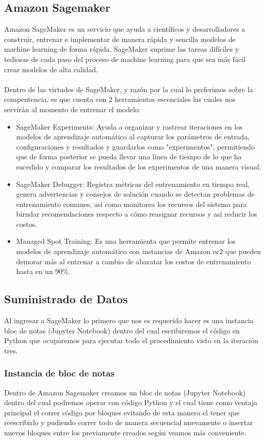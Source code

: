 \documentclass[12pt, a4paper, titlepage]{report}
\begin{document}
	\subsection{Amazon Sagemaker}
	Amazon SageMaker es un servicio que ayuda a científicos y desarrolladores a construir, entrenar e implementar de manera rápida y sencilla modelos de machine learning de forma rápida. SageMaker suprime las tareas difíciles y tediosas de cada paso del proceso de machine learning para que sea más fácil crear modelos de alta calidad.\\\\
	Dentro de las virtudes de SageMaker, y razón por la cual lo preferimos sobre la compentencia, es que cuenta con 2 herramientas escenciales las cuales nos servirán al momento de entrenar el modelo:
	\begin{itemize}
	\item SageMaker Experiments: Ayuda a organizar y rastrear iteraciones en los modelos de aprendizaje automático al capturar los parámetros de entrada, configuraciones y resultados y guardarlos como "experimentos", permitiendo que de forma posterior se pueda llevar una línea de tiempo de lo que ha sucedido y comparar los resultados de los experimentos de una manera visual.
	\item SageMaker Debugger: Registra métricas del entrenamiento en tiempo real, genera advertencias y consejos de solución cuando se detectan problemas de entrenamiento comunes, así como monitorea los recursos del sistema para birndar recomendaciones respecto a cómo reasignar recursos y así reducir los costos.
	\item Managed Spot Training: Es una herramienta que permite entrenar los modelos de aprendizaje automático con instancias de Amazon \acrshort{ec2} que pueden demorar más al entrenar a cambio de abaratar los costos de entrenamiento hasta en un 90\%.
	\end{itemize}
	\newpage
	
	\subsection{Suministrado de Datos}
	Al ingresar a SageMaker lo primero que nos es requerido hacer es una instancia  bloc de notas (Jupyter Notebook) dentro del cual escribiremos el código en Python que ocuparemos para ejecutar todo el procedimiento visto en la iteración tres.
	
		\subsubsection{Instancia de bloc de notas}
		Dentro de Amazon Sagemaker creamos un bloc de notas (Jupyter Notebook) dentro del cual podremos operar con código Python y el cual tiene como ventaja principal el correr código por bloques evitando de esta manera el tener que reescribirlo y pudiendo correr todo de manera secuencial nuevamente o insertar nuevos bloques entre los previamente creados según veamos más conveniente.\\
		
\end{document}
